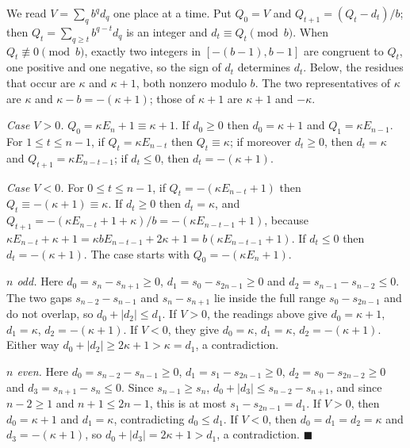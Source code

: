 \documentclass[11pt,letterpaper]{article}
\theoremstyle{paperstyle}
\theoremstyle{paperstyledef}
\theoremstyle{paperstylerem}
\begin{document}
We read \(V = \sum_q b^q d_q\) one place at a time. Put \(Q_0 = V\) and \(Q_{t+1} = (Q_t - d_t)/b\); then \(Q_t = \sum_{q \geq t} b^{q-t} d_q\) is an integer and \(d_t \equiv Q_t \pmod b\). When \(Q_t \not\equiv 0 \pmod b\), exactly two integers in \([-(b-1), b-1]\) are congruent to \(Q_t\), one positive and one negative, so the sign of \(d_t\) determines \(d_t\). Below, the residues that occur are \(\kappa\) and \(\kappa+1\), both nonzero modulo \(b\). The two representatives of \(\kappa\) are \(\kappa\) and \(\kappa - b = -(\kappa+1)\); those of \(\kappa+1\) are \(\kappa+1\) and \(-\kappa\).

\emph{Case \(V > 0\).} \(Q_0 = \kappa E_n + 1 \equiv \kappa + 1\). If \(d_0 \geq 0\) then \(d_0 = \kappa+1\) and \(Q_1 = \kappa E_{n-1}\). For \(1 \leq t \leq n-1\), if \(Q_t = \kappa E_{n-t}\) then \(Q_t \equiv \kappa\); if moreover \(d_t \geq 0\), then \(d_t = \kappa\) and \(Q_{t+1} = \kappa E_{n-t-1}\); if \(d_t \leq 0\), then \(d_t = -(\kappa+1)\).

\emph{Case \(V < 0\).} For \(0 \leq t \leq n-1\), if \(Q_t = -(\kappa E_{n-t} + 1)\) then \(Q_t \equiv -(\kappa+1) \equiv \kappa\). If \(d_t \geq 0\) then \(d_t = \kappa\), and \(Q_{t+1} = -(\kappa E_{n-t} + 1 + \kappa)/b = -(\kappa E_{n-t-1} + 1)\), because \(\kappa E_{n-t} + \kappa + 1 = \kappa b E_{n-t-1} + 2\kappa + 1 = b(\kappa E_{n-t-1} + 1)\). If \(d_t \leq 0\) then \(d_t = -(\kappa+1)\). The case starts with \(Q_0 = -(\kappa E_n + 1)\).

\emph{\(n\) odd.} Here \(d_0 = s_n - s_{n+1} \geq 0\), \(d_1 = s_0 - s_{2n-1} \geq 0\) and \(d_2 = s_{n-1} - s_{n-2} \leq 0\). The two gaps \(s_{n-2} - s_{n-1}\) and \(s_n - s_{n+1}\) lie inside the full range \(s_0 - s_{2n-1}\) and do not overlap, so \(d_0 + \lvert d_2 \rvert \leq d_1\). If \(V > 0\), the readings above give \(d_0 = \kappa+1\), \(d_1 = \kappa\), \(d_2 = -(\kappa+1)\). If \(V < 0\), they give \(d_0 = \kappa\), \(d_1 = \kappa\), \(d_2 = -(\kappa+1)\). Either way \(d_0 + \lvert d_2 \rvert \geq 2\kappa + 1 > \kappa = d_1\), a contradiction.

\emph{\(n\) even.} Here \(d_0 = s_{n-2} - s_{n-1} \geq 0\), \(d_1 = s_1 - s_{2n-1} \geq 0\), \(d_2 = s_0 - s_{2n-2} \geq 0\) and \(d_3 = s_{n+1} - s_n \leq 0\). Since \(s_{n-1} \geq s_n\), \(d_0 + \lvert d_3 \rvert \leq s_{n-2} - s_{n+1}\), and since \(n - 2 \geq 1\) and \(n + 1 \leq 2n - 1\), this is at most \(s_1 - s_{2n-1} = d_1\). If \(V > 0\), then \(d_0 = \kappa + 1\) and \(d_1 = \kappa\), contradicting \(d_0 \leq d_1\). If \(V < 0\), then \(d_0 = d_1 = d_2 = \kappa\) and \(d_3 = -(\kappa+1)\), so \(d_0 + \lvert d_3 \rvert = 2\kappa + 1 > d_1\), a contradiction. \(\blacksquare\)
\end{document}
